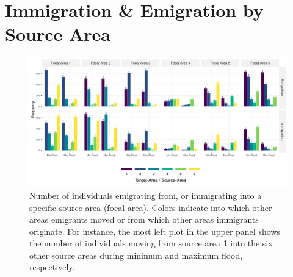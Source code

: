 \documentclass[../FinalThesis.tex]{subfiles}
\begin{document}
\section{Immigration \& Emigration by Source Area}
\begin{figure}[!ht]
 \begin{center}
  \includegraphics[width = \textwidth]{Figures/ImmigrationEmigration.png}
  \caption{Number of individuals emigrating from, or immigrating into a specific
  source area (focal area). Colors indicate into which other areas emigrants
  moved or from which other areas immigrants originate. For instance, the most
  left plot in the upper panel shows the number of individuals moving from
  source area 1 into the six other source areas during minimum and maximum
  flood, respectively.}
  \label{EmigrationImmigration}
 \end{center}
\end{figure}

\newpage
\end{document}
